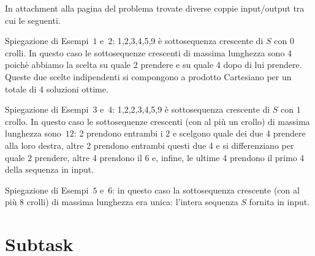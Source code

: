 
In attachment alla pagina del problema trovate diverse coppie input/output tra cui le seguenti.

\vspace{0.5cm}

\vspace{0.5cm}

Spiegazione di Esempi~$1$ e~$2$: 1,2,3,4,5,9 è sottosequenza crescente di $S$ con $0$ crolli. In questo caso le sottosequenze crescenti di massima lunghezza sono 4 poichè abbiamo la scelta su quale 2 prendere e su quale 4 dopo di lui prendere. Queste due scelte indipendenti si compongono a prodotto Cartesiano per un totale di 4 soluzioni ottime. 

\vspace{0.5cm}

\vspace{0.5cm}

Spiegazione di Esempi~$3$ e~$4$: 1,2,2,3,4,5,9 è sottosequenza crescente di $S$ con $1$ crollo. In questo caso le sottosequenze crescenti (con al più un crollo) di massima lunghezza sono~$12$: 2 prendono entrambi i 2 e scelgono quale dei due 4 prendere alla loro destra, altre 2 prendono entrambi questi due 4 e si differenziano per quale 2 prendere, altre 4 prendono il 6 e, infine, le ultime 4 prendono il primo 4 della sequenza in input.

\vspace{0.5cm}

\vspace{0.5cm}

Spiegazione di Esempi~$5$ e~$6$: in questo caso la sottosequenza crescente (con al più 8 crolli) di massima lunghezza era unica: l'intera sequenza $S$ fornita in input.

\section*{Subtask}

